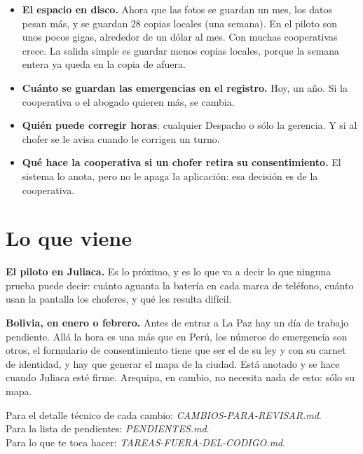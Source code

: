 \documentclass[12pt,a4paper]{article}
\begin{document}
\begin{itemize}[leftmargin=1.2em]
  \item \textbf{El espacio en disco.} Ahora que las fotos se guardan un mes,
  los datos pesan más, y se guardan 28 copias locales (una semana). En el
  piloto son unos pocos gigas, alrededor de un dólar al mes. Con muchas
  cooperativas crece. La salida simple es guardar menos copias locales,
  porque la semana entera ya queda en la copia de afuera.
  \item \textbf{Cuánto se guardan las emergencias en el registro.} Hoy, un
  año. Si la cooperativa o el abogado quieren más, se cambia.
  \item \textbf{Quién puede corregir horas}: cualquier Despacho o sólo la
  gerencia. Y si al chofer se le avisa cuando le corrigen un turno.
  \item \textbf{Qué hace la cooperativa si un chofer retira su consentimiento.}
  El sistema lo anota, pero no le apaga la aplicación: esa decisión es de la
  cooperativa.
\end{itemize}

\section{Lo que viene}

\textbf{El piloto en Juliaca.} Es lo próximo, y es lo que va a decir lo que
ninguna prueba puede decir: cuánto aguanta la batería en cada marca de
teléfono, cuánto usan la pantalla los choferes, y qué les resulta difícil.

\textbf{Bolivia, en enero o febrero.} Antes de entrar a La Paz hay un día de
trabajo pendiente. Allá la hora es una más que en Perú, los números de
emergencia son otros, el formulario de consentimiento tiene que ser el de su
ley y con su carnet de identidad, y hay que generar el mapa de la ciudad. Está
anotado y se hace cuando Juliaca esté firme. Arequipa, en cambio, no necesita
nada de esto: sólo su mapa.

\vspace{2em}
\begin{center}
\small\color{gray}
Para el detalle técnico de cada cambio: \emph{CAMBIOS-PARA-REVISAR.md}.\\
Para la lista de pendientes: \emph{PENDIENTES.md}.\\
Para lo que te toca hacer: \emph{TAREAS-FUERA-DEL-CODIGO.md}.
\end{center}
\end{document}
